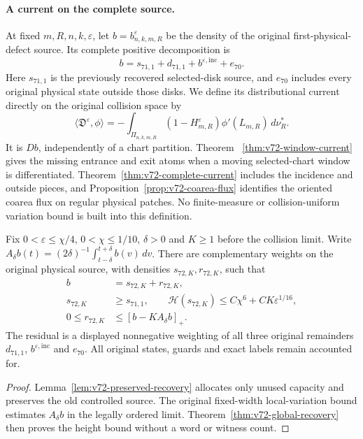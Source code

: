\paragraph{A current on the complete source.}
At fixed $m,R,n,k,\varepsilon$, let $b=b^\varepsilon_{n,k,m,R}$
be the density of the original first-physical-defect source. Its
complete positive decomposition is
\[
 b=s_{71,1}+d_{71,1}+b^{\varepsilon,\mathrm{inc}}+e_{70}.
\]
Here $s_{71,1}$ is the previously recovered selected-disk source,
and $e_{70}$ includes every original physical state outside those
disks. We define its distributional current directly on the original
collision space by
\[
 \langle\mathfrak D^\varepsilon,\phi\rangle
 =-\int_{\Pi_{n,k,m,R}}(1-H_{m,R}^\varepsilon)
                           \phi'(L_{m,R})\,d\nu_R^*.
\]
It is $Db$, independently of a chart partition. Theorem~
\ref{thm:v72-window-current} gives the missing entrance and exit
atoms when a moving selected-chart window is differentiated.
Theorem~\ref{thm:v72-complete-current} includes the incidence and
outside pieces, and Proposition~\ref{prop:v72-coarea-flux}
identifies the oriented coarea flux on regular physical patches.
No finite-measure or collision-uniform variation bound is built into
this definition.

\begin{leadtheorem}
\label{thm:intro-v72-recovery}
Fix $0<\varepsilon\le\chi/4$, $0<\chi\le1/10$, $\delta>0$
and $K\ge1$ before the collision limit. Write
$A_\delta b(t)=(2\delta)^{-1}\int_{t-\delta}^{t+\delta}b(v)\,dv$.
There are complementary weights on the original physical source,
with densities $s_{72,K},r_{72,K}$, such that
\begin{align*}
 b&=s_{72,K}+r_{72,K},\\
 s_{72,K}&\ge s_{71,1},\qquad
 \mathcal H(s_{72,K})\le C\chi^6+CK\varepsilon^{1/16},\\
 0\le r_{72,K}&\le[b-KA_\delta b]_+.
\end{align*}
The residual is a displayed nonnegative weighting of all three
original remainders $d_{71,1}$, $b^{\varepsilon,\mathrm{inc}}$
and $e_{70}$. All original states, guards and exact labels remain
accounted for.
\end{leadtheorem}
\begin{proof}
Lemma~\ref{lem:v72-preserved-recovery} allocates only unused
capacity and preserves the old controlled source. The original
fixed-width local-variation bound estimates $A_\delta b$ in the
legally ordered limit. Theorem~\ref{thm:v72-global-recovery}
then proves the height bound without a word or witness count.
\end{proof}

